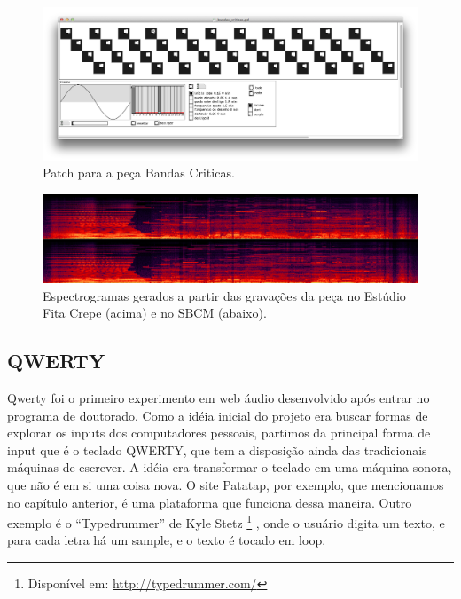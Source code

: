 \begin{figure}
    \caption{\label{bandaspatch}Patch para a peça Bandas Criticas. }
    \begin{center}
    \includegraphics[width=1\linewidth]{pictures/cap3/bandascriticaspd}
    \end{center}
\end{figure}

\begin{figure}
    \caption{\label{bandasciticasspec}Espectrogramas gerados a partir das gravações da peça no Estúdio Fita Crepe (acima) e no SBCM (abaixo). }
    \begin{center}
    \includegraphics[width=1\linewidth]{pictures/cap3/bandascriticasspectro2}
    \end{center}
\end{figure}



\subsection{QWERTY}
\label{sec:QWERTY}
Qwerty foi o primeiro experimento em web áudio desenvolvido após entrar no programa de doutorado. Como a idéia inicial do projeto era buscar formas de explorar os inputs dos computadores pessoais, partimos da principal forma de input que é o teclado QWERTY, que tem a disposição ainda das tradicionais máquinas de escrever. A idéia era transformar o teclado em uma máquina sonora, que não é em si uma coisa nova. O site Patatap, por exemplo, que mencionamos no capítulo anterior, é uma plataforma que funciona dessa maneira. Outro exemplo é o ``Typedrummer'' de Kyle Stetz \footnote{Disponível em: \url{http://typedrummer.com/}} , onde o usuário digita um texto, e para cada letra há um sample, e o texto é tocado em loop.



